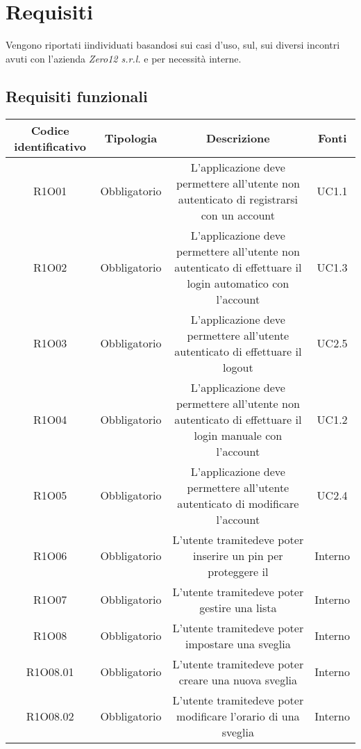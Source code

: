 \chapter{Requisiti}
Vengono riportati iindividuati basandosi sui casi d'uso, sul, sui diversi incontri avuti con l'azienda \textit{Zero12 s.r.l.} e per necessità interne. \\


\newpage
\section{Requisiti funzionali}
\begin{tabularx}{\textwidth}{|C|C|C|C|}
	\hline
     \textbf{Codice identificativo} & \textbf{Tipologia} & \textbf{Descrizione} & \textbf{Fonti} \\
    \hline
	\endhead
	R1O01& Obbligatorio &L'applicazione deve permettere all'utente non autenticato di registrarsi con un account& UC1.1	\\
	\hline
	R1O02& Obbligatorio &L'applicazione deve permettere all'utente non autenticato di effettuare il login automatico con l'account & UC1.3\\
	\hline
	R1O03& Obbligatorio &L'applicazione deve permettere all'utente autenticato di  effettuare il logout & UC2.5\\
	\hline
	R1O04& Obbligatorio &L'applicazione deve permettere all'utente non autenticato di effettuare il login manuale con l'account& UC1.2\\
	\hline
	R1O05& Obbligatorio&L'applicazione deve permettere all'utente autenticato di modificare l'account& UC2.4\\
	\hline
	R1O06& Obbligatorio&L'utente tramitedeve poter inserire un pin per proteggere il & Interno \\
	\hline
	R1O07& Obbligatorio & L'utente tramitedeve poter gestire una lista& Interno\\
	\hline
	R1O08& Obbligatorio &L'utente tramitedeve poter impostare una sveglia &Interno\\
	\hline
	R1O08.01 & Obbligatorio & L'utente tramitedeve poter creare una nuova sveglia &Interno\\
	\hline
	R1O08.02 & Obbligatorio & L'utente tramitedeve poter modificare l'orario di una sveglia &Interno\\

\end{tabularx}
